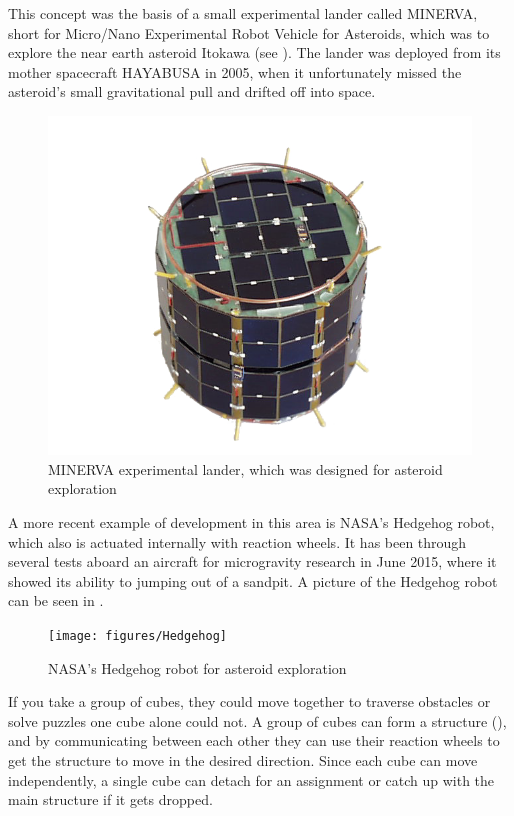 This concept was the basis of a small experimental lander called MINERVA, short for Micro/Nano Experimental Robot Vehicle for Asteroids, which was to explore the near earth asteroid Itokawa (see ). The lander was deployed from its mother spacecraft HAYABUSA in 2005, when it unfortunately missed the asteroid's small gravitational pull and drifted off into space. \cite{TYoshimitsu}
%
\begin{figure}[H] 
	\centering
	\includegraphics[scale=.8]{figures/MINERVA2}
	\caption{MINERVA experimental lander, which was designed for asteroid exploration \cite{TYoshimitsu}}
	\label{MINERVA}
\end{figure}
%
A more recent example of development in this area is NASA's Hedgehog robot, which also is actuated internally with reaction wheels. It has been through several tests aboard an aircraft for microgravity research in June 2015, where it showed its ability to jumping out of a sandpit. A picture of the Hedgehog robot can be seen in . \cite{ELandau}
%
\begin{figure}[H] 
	\centering
	\texttt{[image: figures/Hedgehog]}
	\caption{NASA's Hedgehog robot for asteroid exploration \cite{ELandau}}
	\label{Hedgehog}
\end{figure}
%
If you take a group of cubes, they could move together to traverse obstacles or solve puzzles one cube alone could not. A group of cubes can form a structure (), and by communicating between each other they can use their reaction wheels to get the structure to move in the desired direction. Since each cube can move independently, a single cube can detach for an assignment or catch up with the main structure if it gets dropped.\cite{JRomanishin}
